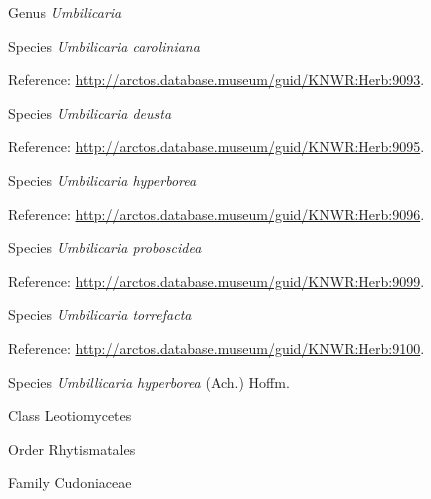 \documentclass[9pt, article]{memoir}
\begin{document}
\begin{multicols}{2}
\vspace{6pt}\noindent\hspace{30pt}Genus \textit{Umbilicaria}


\vspace{6pt}\noindent\hspace{36pt}Species \textit{Umbilicaria caroliniana}


\vspace{6pt}Reference: 
\url{http://arctos.database.museum/guid/KNWR:Herb:9093}.

\vspace{6pt}\noindent\hspace{36pt}Species \textit{Umbilicaria deusta}


\vspace{6pt}Reference: 
\url{http://arctos.database.museum/guid/KNWR:Herb:9095}.

\vspace{6pt}\noindent\hspace{36pt}Species \textit{Umbilicaria hyperborea}


\vspace{6pt}Reference: 
\url{http://arctos.database.museum/guid/KNWR:Herb:9096}.

\vspace{6pt}\noindent\hspace{36pt}Species \textit{Umbilicaria proboscidea}


\vspace{6pt}Reference: 
\url{http://arctos.database.museum/guid/KNWR:Herb:9099}.

\vspace{6pt}\noindent\hspace{36pt}Species \textit{Umbilicaria torrefacta}


\vspace{6pt}Reference: 
\url{http://arctos.database.museum/guid/KNWR:Herb:9100}.

\vspace{6pt}\noindent\hspace{36pt}Species \textit{Umbillicaria hyperborea} (Ach.) Hoffm.


\vspace{6pt}\noindent\hspace{12pt}Class Leotiomycetes


\vspace{6pt}\noindent\hspace{18pt}Order Rhytismatales


\vspace{6pt}\noindent\hspace{24pt}Family Cudoniaceae



\end{multicols}
\end{document}

